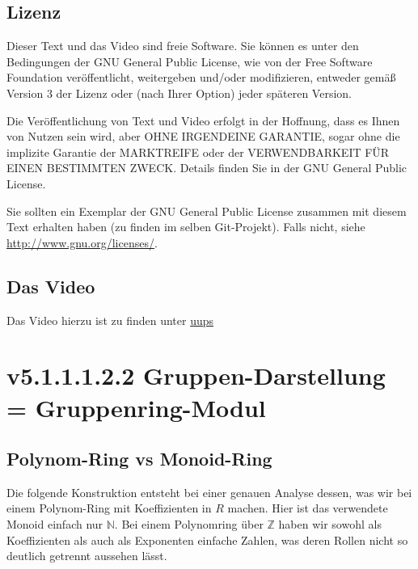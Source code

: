 \documentclass[a4paper]{amsart}
\theoremstyle{definition}
\newcommand{\Z}{\ensuremath{\mathbb{ Z }}}
\newcommand{\N}{\ensuremath{\mathbb{ N }}}
\begin{document}
\subsection*{Lizenz}
Dieser Text und das Video sind freie Software. Sie können es unter den Bedingungen der
GNU General Public License, wie von der Free Software Foundation veröffentlicht, weitergeben
und/oder modifizieren, entweder gemäß Version 3 der Lizenz oder (nach Ihrer Option) jeder späteren Version.

Die Veröffentlichung von Text und Video erfolgt in der Hoffnung, dass es Ihnen von Nutzen sein wird,
aber OHNE IRGENDEINE GARANTIE, sogar ohne die implizite Garantie der MARKTREIFE oder der
VERWENDBARKEIT FÜR EINEN BESTIMMTEN ZWECK. Details finden Sie in der GNU General Public License.

Sie sollten ein Exemplar der GNU General Public License zusammen mit diesem Text erhalten haben
(zu finden im selben Git-Projekt).
Falls nicht, siehe \url{http://www.gnu.org/licenses/}.

\subsection*{Das Video}
Das Video hierzu ist zu finden unter
{\tiny
   \url{uups}
}

\section{v5.1.1.1.2.2 Gruppen-Darstellung = Gruppenring-Modul}

\subsection{Polynom-Ring vs Monoid-Ring}
Die folgende Konstruktion entsteht bei einer genauen Analyse dessen, was wir bei einem Polynom-Ring mit Koeffizienten in $R$ machen. Hier ist das verwendete Monoid einfach nur $\N$. Bei einem Polynomring über $\Z$ haben wir sowohl als Koeffizienten als auch als Exponenten einfache Zahlen, was deren Rollen nicht so deutlich getrennt aussehen lässt. 
\end{document}
